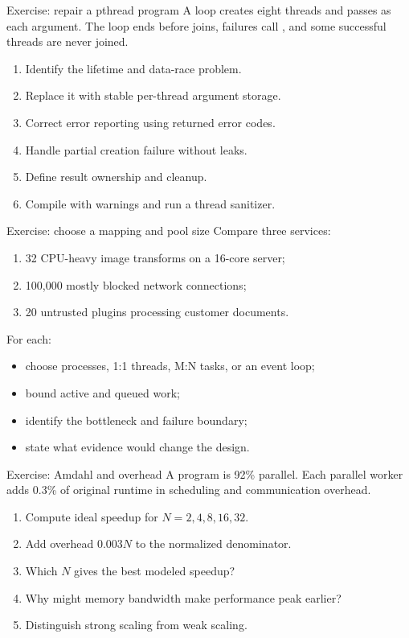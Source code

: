 \documentclass[aspectratio=169,11pt]{beamer}
\newcommand{\code}[1]{\texttt{\detokenize{#1}}}
\begin{document}
\begin{frame}{Exercise: repair a pthread program}
  A loop creates eight threads and passes \code{\&i} as each argument. The loop ends before joins, failures call \code{perror()}, and some successful threads are never joined.
  \begin{enumerate}
    \item Identify the lifetime and data-race problem.
    \item Replace it with stable per-thread argument storage.
    \item Correct error reporting using returned error codes.
    \item Handle partial creation failure without leaks.
    \item Define result ownership and cleanup.
    \item Compile with warnings and run a thread sanitizer.
  \end{enumerate}
\end{frame}

\begin{frame}{Exercise: choose a mapping and pool size}
  Compare three services:
  \begin{enumerate}
    \item 32 CPU-heavy image transforms on a 16-core server;
    \item 100,000 mostly blocked network connections;
    \item 20 untrusted plugins processing customer documents.
  \end{enumerate}
  For each:
  \begin{itemize}
    \item choose processes, 1:1 threads, M:N tasks, or an event loop;
    \item bound active and queued work;
    \item identify the bottleneck and failure boundary;
    \item state what evidence would change the design.
  \end{itemize}
\end{frame}

\begin{frame}{Exercise: Amdahl and overhead}
  A program is 92\% parallel. Each parallel worker adds 0.3\% of original runtime in scheduling and communication overhead.
  \begin{enumerate}
    \item Compute ideal speedup for $N=2,4,8,16,32$.
    \item Add overhead $0.003N$ to the normalized denominator.
    \item Which $N$ gives the best modeled speedup?
    \item Why might memory bandwidth make performance peak earlier?
    \item Distinguish strong scaling from weak scaling.
  \end{enumerate}
\end{frame}
\end{document}
